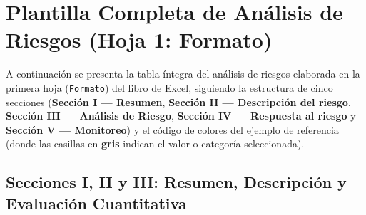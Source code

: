 \documentclass[letterpaper,11pt]{article}
\begin{document}
\section{Plantilla Completa de Análisis de Riesgos (Hoja 1: Formato)}

A continuación se presenta la tabla íntegra del análisis de riesgos elaborada en la primera hoja (\texttt{Formato}) del libro de Excel, siguiendo la estructura de cinco secciones (\textbf{Sección I --- Resumen}, \textbf{Sección II --- Descripción del riesgo}, \textbf{Sección III --- Análisis de Riesgo}, \textbf{Sección IV --- Respuesta al riesgo} y \textbf{Sección V --- Monitoreo}) y el código de colores del ejemplo de referencia (donde las casillas en \textbf{gris} indican el valor o categoría seleccionada).

\vspace{0.2cm}

\subsection{Secciones I, II y III: Resumen, Descripción y Evaluación Cuantitativa}
\end{document}

